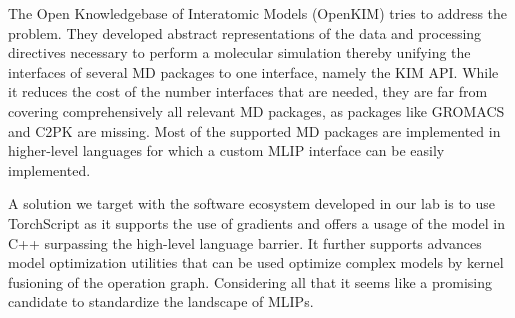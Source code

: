 
The Open Knowledgebase of Interatomic Models (OpenKIM)\cite{karls2020openkim} tries to address the problem.
They developed abstract representations of the data and processing directives necessary to perform a molecular simulation thereby unifying the interfaces of several MD packages to one interface, namely the KIM API\cite{elliott2011kim}.
While it reduces the cost of the number interfaces that are needed, they are far from covering comprehensively all relevant MD packages, as packages like GROMACS\cite{hess+08jctc} and C2PK\cite{kuhne2020cp2k} are missing.
Most of the supported MD packages are implemented in higher-level languages for which a custom MLIP interface can be easily implemented.

A solution we target with the software ecosystem developed in our lab is to use TorchScript as it supports the use of gradients and offers a usage of the model in C++ surpassing the high-level language barrier.
It further supports advances model optimization utilities that can be used optimize complex models by kernel fusioning of the operation graph.
Considering all that it seems like a promising candidate to standardize the landscape of MLIPs.


